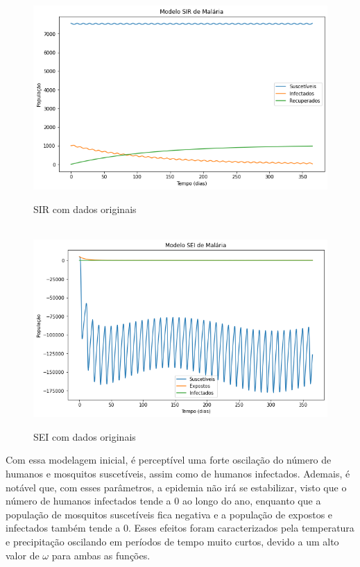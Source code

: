 \begin{figure}[!ht]
        \centering
        \hbox{\hspace{4em} \includegraphics[scale=0.5] {SIR_Dados_Originais_Parham_Michael.png}}
        \caption{SIR com dados originais}
\end{figure} 
\begin{figure}[!ht]
        \centering
        \hbox{\hspace{3em} \includegraphics[scale=0.5] {SEI_Dados_Originais_Parham_Michael.png}}
        \caption{SEI com dados originais}
\end{figure} 
\newpage
Com essa modelagem inicial, é perceptível uma forte oscilação do número de humanos e mosquitos suscetíveis, assim como de humanos infectados. Ademais, é notável que, com esses parâmetros, a epidemia não irá se estabilizar, visto que o número de humanos infectados tende a 0 ao longo do ano, enquanto que a população de mosquitos suscetíveis fica negativa e a população de expostos e infectados também tende a 0. Esses efeitos foram caracterizados pela temperatura e precipitação oscilando em períodos de tempo muito curtos, devido a um alto valor de $\omega$ para ambas as funções. 
